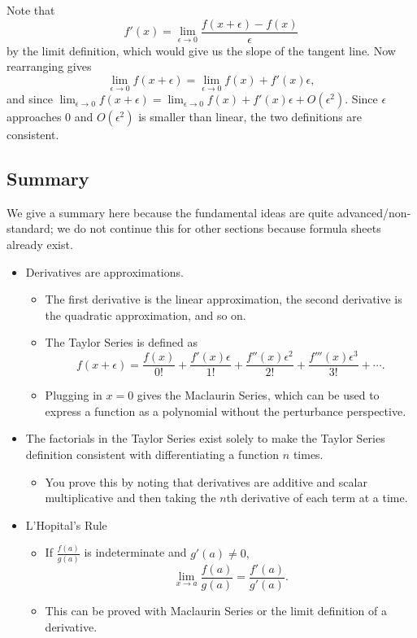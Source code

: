 \documentclass{article}
\begin{document}
\begin{pro}
Note that \[f'(x)=\lim_{\epsilon\to 0}\frac{f(x+\epsilon)-f(x)}{\epsilon}\] by the limit definition, which would give us the slope of the tangent line. Now rearranging gives
\[\lim_{\epsilon\to 0}f(x+\epsilon)=\lim_{\epsilon\to 0}f(x)+f'(x)\epsilon,\]
and since $\lim_{\epsilon\to 0}f(x+\epsilon)=\lim_{\epsilon\to 0}f(x)+f'(x)\epsilon+O(\epsilon^2).$ Since $\epsilon$ approaches $0$ and $O(\epsilon^2)$ is smaller than linear, the two definitions are consistent.
\end{pro}

\subsection{Summary}
We give a summary here because the fundamental ideas are quite advanced/non-standard; we do not continue this for other sections because formula sheets already exist. 
\begin{itemize}
\item Derivatives are approximations.
\begin{itemize}
\item The first derivative is the linear approximation, the second derivative is the quadratic approximation, and so on.
\item The Taylor Series is defined as \[f(x+\epsilon)=\frac{f(x)}{0!}+\frac{f'(x)\epsilon}{1!}+\frac{f''(x)\epsilon^2}{2!}+\frac{f'''(x)\epsilon^3}{3!}+\cdots.\]
\item Plugging in $x=0$ gives the Maclaurin Series, which can be used to express a function as a polynomial without the perturbance perspective.
\end{itemize}
\item The factorials in the Taylor Series exist solely to make the Taylor Series definition consistent with differentiating a function $n$ times.
\begin{itemize}
\item You prove this by noting that derivatives are additive and scalar multiplicative and then taking the $n$th derivative of each term at a time.
\end{itemize}
\item L'Hopital's Rule
\begin{itemize}
\item If $\frac{f(a)}{g(a)}$ is indeterminate and $g'(a)\neq 0,$
\[\lim_{x\to a}\frac{f(a)}{g(a)}=\frac{f'(a)}{g'(a)}.\]
\item This can be proved with Maclaurin Series or the limit definition of a derivative.
\end{itemize}
\end{itemize}
\end{document}
